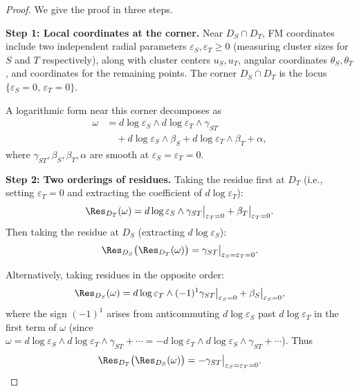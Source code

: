 \begin{proof}
We give the proof in three steps.

\textbf{Step 1: Local coordinates at the corner.}
Near $D_S \cap D_T$, FM coordinates include two independent radial parameters $\varepsilon_S, \varepsilon_T \geq 0$ (measuring cluster sizes for $S$ and $T$ respectively), along with cluster centers $u_S, u_T$, angular coordinates $\theta_S, \theta_T$, and coordinates for the remaining points. The corner $D_S \cap D_T$ is the locus $\{\varepsilon_S = 0,\, \varepsilon_T = 0\}$.

A logarithmic form near this corner decomposes as
\begin{align*}
\omega &= d\log\varepsilon_S \wedge d\log\varepsilon_T \wedge \gamma_{ST} \\
&\quad + d\log\varepsilon_S \wedge \beta_S + d\log\varepsilon_T \wedge \beta_T + \alpha,
\end{align*}
where $\gamma_{ST}, \beta_S, \beta_T, \alpha$ are smooth at $\varepsilon_S = \varepsilon_T = 0$.

\textbf{Step 2: Two orderings of residues.}
Taking the residue first at $D_T$ (i.e., setting $\varepsilon_T = 0$ and extracting the coefficient of $d\log\varepsilon_T$):
\[
\Res_{D_T}(\omega) = d\log\varepsilon_S \wedge \gamma_{ST}\big|_{\varepsilon_T=0} + \beta_T\big|_{\varepsilon_T=0}.
\]
Then taking the residue at $D_S$ (extracting $d\log\varepsilon_S$):
\[
\Res_{D_S}\bigl(\Res_{D_T}(\omega)\bigr) = \gamma_{ST}\big|_{\varepsilon_S=\varepsilon_T=0}.
\]

Alternatively, taking residues in the opposite order:
\[
\Res_{D_S}(\omega) = d\log\varepsilon_T \wedge (-1)^1 \gamma_{ST}\big|_{\varepsilon_S=0} + \beta_S\big|_{\varepsilon_S=0},
\]
where the sign $(-1)^1$ arises from anticommuting $d\log\varepsilon_S$ past $d\log\varepsilon_T$ in the first term of $\omega$ (since $\omega = d\log\varepsilon_S \wedge d\log\varepsilon_T \wedge \gamma_{ST} + \cdots = -d\log\varepsilon_T \wedge d\log\varepsilon_S \wedge \gamma_{ST} + \cdots$). Thus
\[
\Res_{D_T}\bigl(\Res_{D_S}(\omega)\bigr) = -\gamma_{ST}\big|_{\varepsilon_S=\varepsilon_T=0}.
\]


\end{proof}
